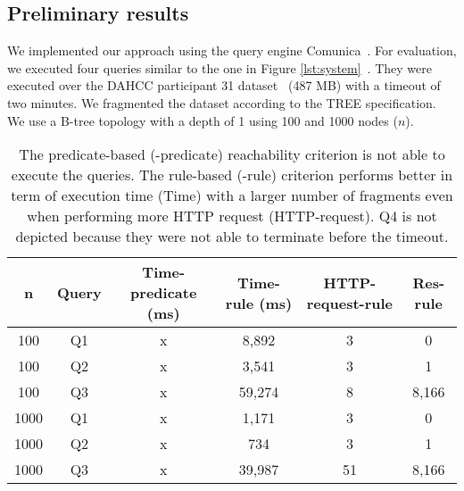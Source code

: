 \subsection{Preliminary results}

We implemented our approach using the query engine Comunica~\cite{comunica}.
For evaluation, we executed four queries similar to the one in Figure \ref{lst:system}~.
They were executed over the DAHCC participant 31 dataset~\cite{dahcc_resource} (487 MB) with a timeout of two minutes.
We fragmented the dataset according to the TREE specification.
We use a B-tree topology with a depth of 1 using 100 and 1000 nodes ($n$).

\begin{table}[ht]
    \centering
    \begin{tabular}{|c|c|c|c|c|c|}
        \hline
        \textbf{n} & \textbf{Query} & \textbf{Time-predicate (ms)}  & \textbf{Time-rule (ms)} & \textbf{HTTP-request-rule} & \textbf{Res-rule} \\
        \hline
        100 & Q1 & x & 8,892& 3 & 0 \\
        100 & Q2 & x & 3,541& 3 & 1 \\
        100 & Q3 & x & 59,274& 8 & 8,166 \\
        \hhline{|=|=|=|=|=|=|}
        1000 & Q1 & x & 1,171& 3 & 0 \\
        1000 & Q2 & x & 734& 3 & 1 \\
        1000 & Q3 & x & 39,987& 51 & 8,166 \\
        \hline
    \end{tabular}
    \caption{
    The predicate-based (-predicate) reachability criterion is not able to execute the queries. 
    The rule-based (-rule) criterion performs better in term of execution time (Time) with a larger number of fragments even when performing more HTTP request (HTTP-request).
    Q4 is not depicted because they were not able to terminate before the timeout.
    }
    \label{tab:result}
    \vspace*{-0.15cm}
\end{table}

